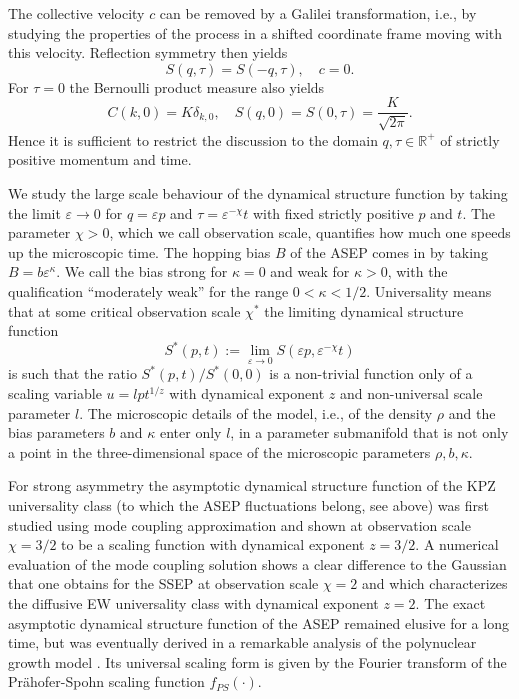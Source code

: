 \documentclass[12pt]{article}
\newcommand{\R}{{\mathbb R}}
\begin{document}
The collective velocity $c$ can be removed by a Galilei 
transformation, i.e., by studying the properties of the process in a 
shifted coordinate frame moving with this velocity.
Reflection symmetry then yields
\begin{equation}
S(q,\tau) = S(-q,\tau), \quad c = 0.
\label{refsym}
\end{equation}
For $\tau=0$
the Bernoulli product measure also yields
\begin{equation}
C(k,0) = K \delta_{k,0}, \quad 
S(q,0) = S(0,\tau) = \frac{K}{\sqrt{2\pi}}.
\label{Covtau0}
\end{equation}
Hence it is sufficient to restrict the discussion to the domain
$q,\tau\in\R^+$ of strictly positive momentum and time.


We study the large scale behaviour of the dynamical structure function 
by taking the limit $\varepsilon\to 0$ for $q = \varepsilon p$ and 
$\tau = \varepsilon^{-\chi} t$ with fixed strictly positive $p$ and $t$. 
The parameter $\chi>0$, which we call observation scale, quantifies 
how much one speeds up the microscopic time. The hopping bias $B$ 
of the ASEP comes in by taking $B=b \varepsilon^{\kappa}$.
We call the bias strong for $\kappa = 0$ and weak for $\kappa > 0$, 
with the qualification ``moderately weak'' for the range 
$0 < \kappa < 1/2$. Universality means that at some critical
observation scale $\chi^\ast$ the limiting dynamical structure 
function 
\begin{equation}
S^\ast(p,t) := \lim_{\varepsilon \to 0} 
S(\varepsilon p,\varepsilon^{-\chi} t)
\end{equation}
is such that the ratio $S^\ast(p,t)/S^\ast(0,0)$ is a non-trivial function 
only of a scaling variable $u=l p t^{1/z}$ with dynamical exponent 
$z$ and non-universal scale parameter $l$. The microscopic details
of the model, i.e., of the density $\rho$ and the bias parameters 
$b$ and $\kappa$ enter only $l$, in a
parameter submanifold that is not only a point in the three-dimensional
space of the microscopic parameters $\rho,b,\kappa$.


For strong asymmetry the asymptotic dynamical structure function of 
the KPZ universality class (to which the ASEP fluctuations belong, see 
above) was first studied using mode coupling approximation 
\cite{vanB85} and shown at observation scale $\chi=3/2$ to be a 
scaling function with dynamical exponent $z=3/2$. A numerical 
evaluation of the mode coupling solution \cite{Frey96,Cola01} 
shows a clear difference to the Gaussian that one obtains for the SSEP 
at observation scale $\chi=2$ and which characterizes the 
diffusive EW universality class with dynamical exponent $z=2$. The 
exact asymptotic dynamical structure function of the ASEP remained 
elusive for a long time, but was eventually derived 
in a remarkable analysis of the polynuclear growth model 
\cite{Prae04,FerrPL06}. Its universal scaling form 
is given by the Fourier transform of the
Pr\"ahofer-Spohn scaling function $f_{PS}(\cdot)$.
\end{document}
